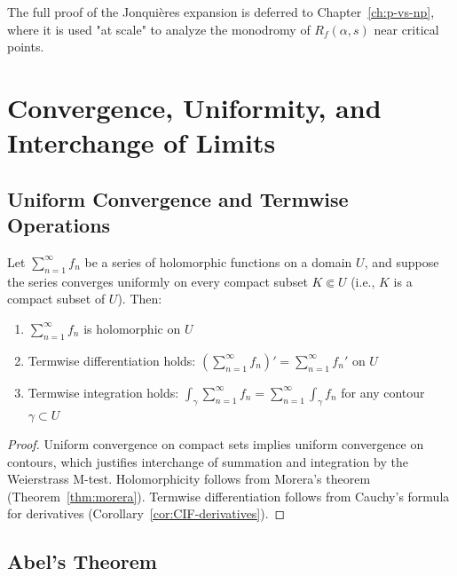 \begin{remark}
The full proof of the Jonquières expansion is deferred to Chapter~\ref{ch:p-vs-np}, where it is used "at scale" to analyze the monodromy of $R_f(\alpha, s)$ near critical points.
\end{remark}

\section{Convergence, Uniformity, and Interchange of Limits}
\label{sec:dirichlet-convergence}

\subsection{Uniform Convergence and Termwise Operations}

\begin{lemma}\label{lem:uniform-window}
Let $\sum_{n=1}^{\infty} f_n$ be a series of holomorphic functions on a domain $U$, and suppose the series converges uniformly on every compact subset $K \Subset U$ (i.e., $K$ is a compact subset of $U$). Then:
\begin{enumerate}
\item $\sum_{n=1}^{\infty} f_n$ is holomorphic on $U$
\item Termwise differentiation holds: $\displaystyle \left( \sum_{n=1}^{\infty} f_n \right)' = \sum_{n=1}^{\infty} f_n'$ on $U$
\item Termwise integration holds: $\displaystyle \int_{\gamma} \sum_{n=1}^{\infty} f_n = \sum_{n=1}^{\infty} \int_{\gamma} f_n$ for any contour $\gamma \subset U$
\end{enumerate}
\end{lemma}

\begin{proof}
Uniform convergence on compact sets implies uniform convergence on contours, which justifies interchange of summation and integration by the Weierstrass M-test. Holomorphicity follows from Morera's theorem (Theorem~\ref{thm:morera}). Termwise differentiation follows from Cauchy's formula for derivatives (Corollary~\ref{cor:CIF-derivatives}).
\end{proof}

\subsection{Abel's Theorem}

